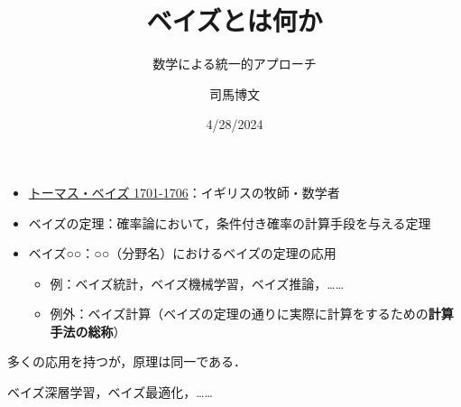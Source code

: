 \documentclass[
  ignorenonframetext,
]{beamer}
\title{ベイズとは何か}
\subtitle{数学による統一的アプローチ}
\author{司馬博文}
\date{4/28/2024}
\providecommand{\tightlist}{%
  \setlength{\itemsep}{0pt}\setlength{\parskip}{0pt}}\usepackage{longtable,booktabs,array}
\begin{document}
\frame{\titlepage}

\begin{frame}
\begin{itemize}
\tightlist
\item
  \href{https://ja.wikipedia.org/wiki/\%E3\%83\%88\%E3\%83\%BC\%E3\%83\%9E\%E3\%82\%B9\%E3\%83\%BB\%E3\%83\%99\%E3\%82\%A4\%E3\%82\%BA}{トーマス・ベイズ
  1701-1706}：イギリスの牧師・数学者
\item
  ベイズの定理：確率論において，条件付き確率の計算手段を与える定理
\item
  ベイズ○○：○○（分野名）におけるベイズの定理の応用

  \begin{itemize}
  \tightlist
  \item
    例：ベイズ統計，ベイズ機械学習，ベイズ推論，\ldots\ldots{}
  \item
    例外：ベイズ計算（ベイズの定理の通りに実際に計算をするための\textbf{計算手法の総称}）
  \end{itemize}
\end{itemize}

多くの応用を持つが，原理は同一である．

ベイズ深層学習，ベイズ最適化，\ldots\ldots{}
\end{frame}
\end{document}
